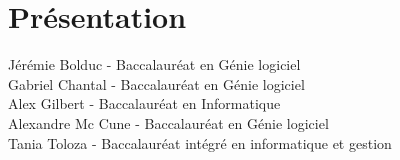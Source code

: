 \chapter{Présentation}
\label{s:presentation}


Jérémie Bolduc - Baccalauréat en Génie logiciel\\
Gabriel Chantal - Baccalauréat en Génie logiciel\\
Alex Gilbert - Baccalauréat en Informatique\\
Alexandre Mc Cune - Baccalauréat en Génie logiciel\\
Tania Toloza - Baccalauréat intégré en informatique et gestion\\
